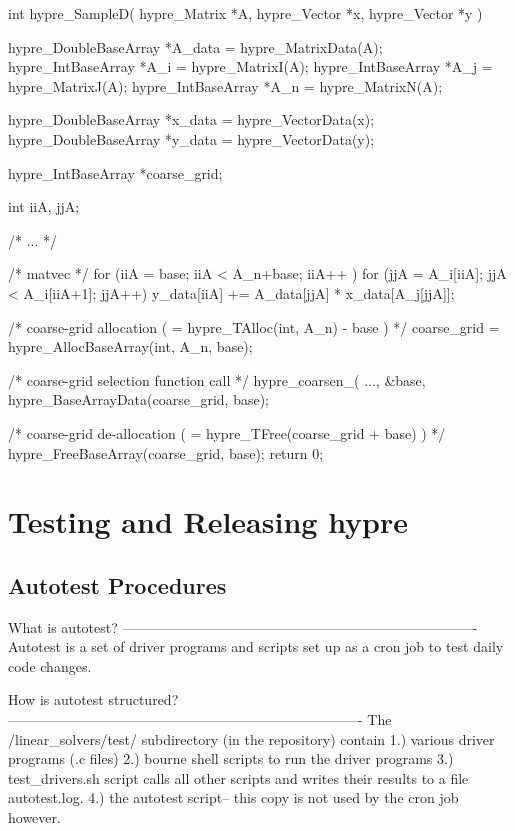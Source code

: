 int
hypre_SampleD( hypre_Matrix *A,
               hypre_Vector *x,
               hypre_Vector *y )
{
   hypre_DoubleBaseArray  *A_data = hypre_MatrixData(A);
   hypre_IntBaseArray     *A_i    = hypre_MatrixI(A);
   hypre_IntBaseArray     *A_j    = hypre_MatrixJ(A);
   hypre_IntBaseArray     *A_n    = hypre_MatrixN(A);

   hypre_DoubleBaseArray  *x_data = hypre_VectorData(x);
   hypre_DoubleBaseArray  *y_data = hypre_VectorData(y);

   hypre_IntBaseArray     *coarse_grid;

   int                     iiA, jjA;

   /* ... */

   /* matvec */
   for (iiA = base; iiA < A_n+base; iiA++ )
   {
      for (jjA = A_i[iiA]; jjA < A_i[iiA+1]; jjA++)
      {
         y_data[iiA] += A_data[jjA] * x_data[A_j[jjA]];
      }
   }

   /* coarse-grid allocation ( = hypre_TAlloc(int, A_n) - base ) */
   coarse_grid = hypre_AllocBaseArray(int, A_n, base);

   /* coarse-grid selection function call */
   hypre_coarsen_( ..., &base,
                   hypre_BaseArrayData(coarse_grid, base);

   /* coarse-grid de-allocation ( = hypre_TFree(coarse_grid + base) ) */
   hypre_FreeBaseArray(coarse_grid, base);
   return 0;
}

\section{Testing and Releasing hypre}

\subsection{Autotest Procedures}
What is autotest?
----------------------------------------------------------------------------
Autotest is a set of driver programs and scripts set up as a cron job to test daily code changes.

How is autotest structured?
----------------------------------------------------------------------------
The /linear_solvers/test/ subdirectory (in the repository) contain
1.) various driver programs (.c files)
2.) bourne shell scripts to run the driver programs
3.) test_drivers.sh script calls all other scripts and writes their results to a file autotest.log.
4.) the autotest script-- this copy is not used by the cron job however.

